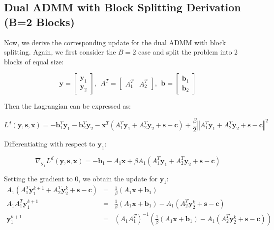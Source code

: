 \documentclass{article}
\begin{document}
\subsection*{Dual ADMM with Block Splitting Derivation (B=2 Blocks)}
Now, we derive the corresponding update for the dual ADMM with block splitting. Again, we first consider the $B=2$ case and split the problem into 2 blocks of equal size:

\[
\mathbf{y}=\begin{bmatrix}\mathbf{y}_{1}\\
\mathbf{y}_{2}
\end{bmatrix},
\ \
A^{T}=\begin{bmatrix}A_{1}^{T} & A_{2}^{T}\end{bmatrix},
\ \ 
\mathbf{b}=\begin{bmatrix}\mathbf{b}_{1}\\
\mathbf{b}_{2}
\end{bmatrix}
\]

Then the Lagrangian can be expressed as:

\[
L^{d}(\mathbf{y},\mathbf{s},\mathbf{x})=-\mathbf{b}_{1}^{T}\mathbf{y}_{1}-\mathbf{b}_{2}^{T}\mathbf{y}_{2}-\mathbf{x}^{T}\left(A_{1}^{T}\mathbf{y}_{1}+A_{2}^{T}\mathbf{y}_{2}+\mathbf{s}-\mathbf{c}\right)+\frac{\beta}{2}\left\Vert A_{1}^{T}\mathbf{y}_{1}+A_{2}^{T}\mathbf{y}_{2}+\mathbf{s}-\mathbf{c}\right\Vert ^{2}
\]


Differentiating with respect to $\mathbf{y}_{1}$:

\[
\nabla_{\mathbf{y}_{1}}L^{d}(\mathbf{y},\mathbf{s},\mathbf{x})=-\mathbf{b}_{1}-A_{1}\mathbf{x}+\beta A_{1}\left(A_{1}^{T}\mathbf{y}_{1}+A_{2}^{T}\mathbf{y}_{2}+\mathbf{s}-\mathbf{c}\right)
\]

Setting the gradient to 0, we obtain the update for $\mathbf{y}_{1}$:
\begin{eqnarray*}
A_{1}\left(A_{1}^{T}\mathbf{y}_{1}^{k+1}+A_{2}^{T}\mathbf{y}_{2}^{k}+\mathbf{s}-\mathbf{c}\right) & = & \frac{1}{\beta}\left(A_{1}\mathbf{x}+\mathbf{b}_{1}\right)\\
A_{1}A_{1}^{T}\mathbf{y}_{1}^{k+1} & = & \frac{1}{\beta}\left(A_{1}\mathbf{x}+\mathbf{b}_{1}\right)-A_{1}\left(A_{2}^{T}\mathbf{y}_{2}^{k}+\mathbf{s}-\mathbf{c}\right)\\
\mathbf{y}_{1}^{k+1} & = & \left(A_{1}A_{1}^{T}\right)^{-1}\left(\frac{1}{\beta}\left(A_{1}\mathbf{x}+\mathbf{b}_{1}\right)-A_{1}\left(A_{2}^{T}\mathbf{y}_{2}^{k}+\mathbf{s}-\mathbf{c}\right)\right)
\end{eqnarray*}
\end{document}
